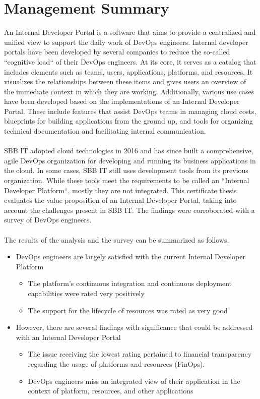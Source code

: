 \documentclass[a4paper,10pt]{article}
\begin{document}
    \section*{Management Summary}
    An Internal Developer Portal is a software that aims to provide a centralized and unified view to support the daily
    work of DevOps engineers.
    Internal developer portals have been developed by several companies to reduce the so-called ``cognitive load`` of
    their DevOps engineers.
    At its core, it serves as a catalog that includes elements such as teams, users, applications, platforms, and resources.
    It visualizes the relationships between these items and gives users an overview of the immediate context in
    which they are working.
    Additionally, various use cases have been developed based on the implementations of an Internal Developer Portal.
    These include features that assist DevOps teams in managing cloud costs, blueprints for building applications from
    the ground up, and tools for organizing technical documentation and facilitating internal communication.\\ \\
    SBB IT adopted cloud technologies in 2016 and has since built a comprehensive, agile DevOps organization for
    developing and running its business applications in the cloud.
    In some cases, SBB IT still uses development tools from its previous organization.
    While these tools meet the requirements to be called an ``Internal Developer Platform``, mostly they are not integrated.
    This certificate thesis evaluates the value proposition of an Internal Developer Portal, taking into account the
    challenges present in SBB IT.
    The findings were corroborated with a survey of DevOps engineers.  \\ \\
    The results of the analysis and the survey can be summarized as follows.
    \begin{itemize}
        \item DevOps engineers are largely satisfied with the current Internal Developer Platform
        \begin{itemize}
            \item The platform's continuous integration and continuous deployment capabilities were rated very positively
            \item The support for the lifecycle of resources was rated as very good
        \end{itemize}

        \item However, there are several findings with significance that could be addressed with an Internal Developer Portal
        \begin{itemize}
            \item The issue receiving the lowest rating pertained to financial transparency regarding the usage of platforms and resources (FinOps).
            \item DevOps engineers miss an integrated view of their application in the context of platform, resources, and other applications
        \end{itemize}
    \end{itemize}
\end{document}
